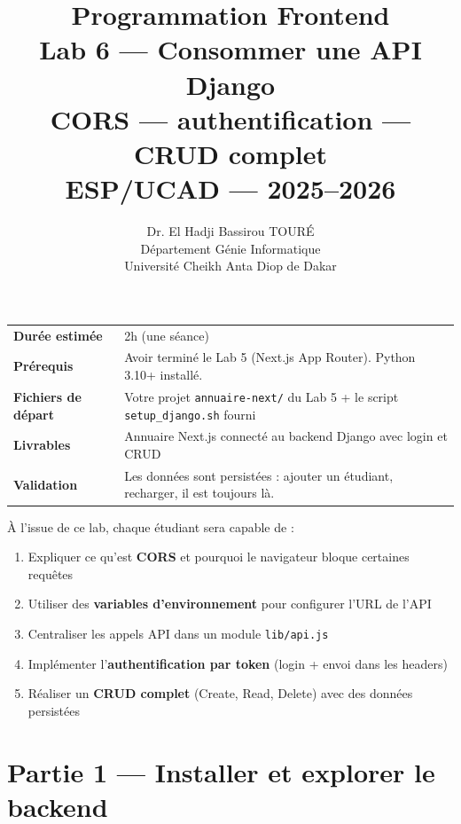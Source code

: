 \documentclass[11pt,a4paper]{article}
\title{\vspace{-1cm}\textbf{\LARGE Programmation Frontend}\\[0.8cm]\textbf{\huge Lab 6 --- Consommer une API Django}\\[0.3cm]\textbf{\Large CORS --- authentification --- CRUD complet}\\[0.5cm]\large ESP/UCAD --- 2025--2026}
\author{Dr. El Hadji Bassirou TOURÉ\\Département Génie Informatique\\Université Cheikh Anta Diop de Dakar}
\date{}
\begin{document}
\maketitle
\thispagestyle{empty}
\vspace{0.5cm}

\begin{prereqbox}
\begin{center}
\begin{tabular}{lp{10cm}}
\toprule
\textbf{Durée estimée} & 2h (une séance) \\
\textbf{Prérequis} & Avoir terminé le Lab 5 (Next.js App Router). Python 3.10+ installé. \\
\textbf{Fichiers de départ} & Votre projet \texttt{annuaire-next/} du Lab 5 + le script \texttt{setup\_django.sh} fourni \\
\textbf{Livrables} & Annuaire Next.js connecté au backend Django avec login et CRUD \\
\textbf{Validation} & Les données sont persistées : ajouter un étudiant, recharger, il est toujours là. \\
\bottomrule
\end{tabular}
\end{center}
\end{prereqbox}

\begin{objectifbox}
À l'issue de ce lab, chaque étudiant sera capable de :
\begin{enumerate}[nosep]
\item Expliquer ce qu'est \textbf{CORS} et pourquoi le navigateur bloque certaines requêtes
\item Utiliser des \textbf{variables d'environnement} pour configurer l'URL de l'API
\item Centraliser les appels API dans un module \texttt{lib/api.js}
\item Implémenter l'\textbf{authentification par token} (login + envoi dans les headers)
\item Réaliser un \textbf{CRUD complet} (Create, Read, Delete) avec des données persistées
\end{enumerate}
\end{objectifbox}

\tableofcontents
\newpage

\section{Partie 1 --- Installer et explorer le backend}
\end{document}
